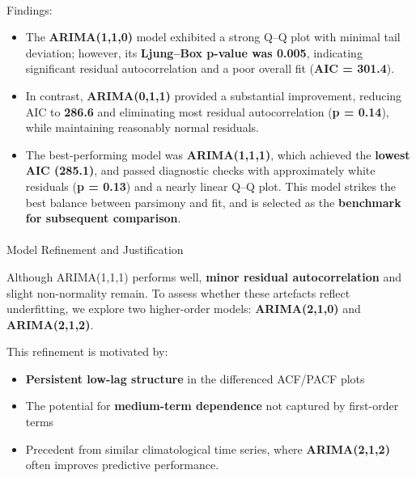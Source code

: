 \documentclass[
  11pt,
]{article}
\makeatletter
\let\oldparagraph\paragraph
\renewcommand{\paragraph}{
    \@ifstar
      \xxxParagraphStar
      \xxxParagraphNoStar
  }
\newcommand{\xxxParagraphStar}[1]{\oldparagraph*{#1}\mbox{}}
\newcommand{\xxxParagraphNoStar}[1]{\oldparagraph{#1}\mbox{}}
\makeatother
\begin{document}
\paragraph{Findings:}\label{findings}

\begin{itemize}
\item
  The \textbf{ARIMA(1,1,0)} model exhibited a strong Q--Q plot with
  minimal tail deviation; however, its \textbf{Ljung--Box p-value was
  0.005}, indicating significant residual autocorrelation and a poor
  overall fit (\textbf{AIC = 301.4}).
\item
  In contrast, \textbf{ARIMA(0,1,1)} provided a substantial improvement,
  reducing AIC to \textbf{286.6} and eliminating most residual
  autocorrelation (\textbf{p = 0.14}), while maintaining reasonably
  normal residuals.
\item
  The best-performing model was \textbf{ARIMA(1,1,1)}, which achieved
  the \textbf{lowest AIC (285.1)}, and passed diagnostic checks with
  approximately white residuals (\textbf{p = 0.13}) and a nearly linear
  Q--Q plot. This model strikes the best balance between parsimony and
  fit, and is selected as the \textbf{benchmark for subsequent
  comparison}.
\end{itemize}

\paragraph{Model Refinement and
Justification}\label{model-refinement-and-justification}

Although ARIMA(1,1,1) performs well, \textbf{minor residual
autocorrelation} and slight non-normality remain. To assess whether
these artefacts reflect underfitting, we explore two higher-order
models: \textbf{ARIMA(2,1,0)} and \textbf{ARIMA(2,1,2)}.

This refinement is motivated by:

\begin{itemize}
\item
  \textbf{Persistent low-lag structure} in the differenced ACF/PACF
  plots
\item
  The potential for \textbf{medium-term dependence} not captured by
  first-order terms
\item
  Precedent from similar climatological time series, where
  \textbf{ARIMA(2,1,2)} often improves predictive performance.
\end{itemize}
\end{document}
